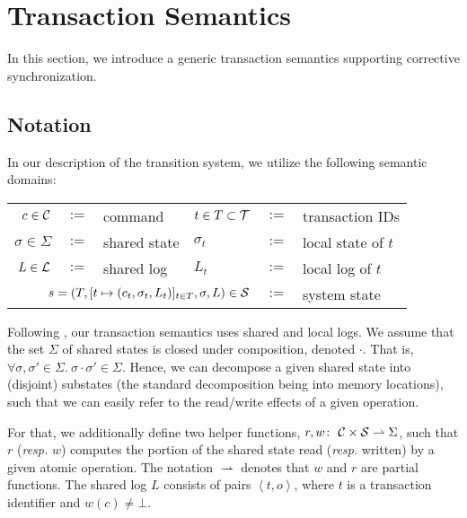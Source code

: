 \section{Transaction Semantics}
\label{sec:concretesemantics}

In this section, we introduce a generic transaction semantics supporting corrective synchronization.

\subsection{Notation}
\label{sec:concretedomain}

In our description of the transition system, we utilize the following semantic domains:
\vspace{-4pt}
\begin{center}
\footnotesize
\begin{tabular}{rcllrl}
	$c \in {\cal C}$ & $:=$ & command & $t \in T \subset {\cal T}$ & $:=$ & transaction IDs \\
	$\sigma \in \Sigma$ & $:=$ & shared state & ${\sigma_t}$ & $:=$ & local state of $t$ \\
	$L \in {\cal L}$ & $:=$ & shared log &
	$L_t$ & $:=$ & local log of $t$ \\
	\multicolumn{4}{r}{
		$s = (T, [t \mapsto (c_t,\sigma_t,L_t)]_{t \in T}, \sigma, L) \in {\cal S}$} & $:=$ & system state \\
\end{tabular}
\end{center}
\vspace{-4pt}
\normalsize
Following \cite{KoskinenP15}, our transaction semantics uses shared and local logs.
We assume that the set $\Sigma$ of shared states is closed under composition, denoted $\cdot$. That is,
$\forall \sigma,\sigma' \in \Sigma.\ \sigma \cdot \sigma' \in \Sigma$. Hence, we can decompose a given shared state into (disjoint) substates (the standard decomposition being into memory locations), such that we can easily refer to the read/write effects of a given operation.

For that, we additionally define two helper functions,
$r,w \colon\ {\cal C} \times {\cal S} \rightharpoonup \Sigma$, such that $r$ (\textit{resp.} $w$) computes the portion of the shared state read (\textit{resp.} written) by a given atomic operation.
The notation $\rightharpoonup$ denotes that $w$ and $r$ are partial functions. The shared log $L$ consists of pairs $\left\langle t,o \right\rangle$, where $t$ is a transaction identifier and $w(c) \neq \bot$.

